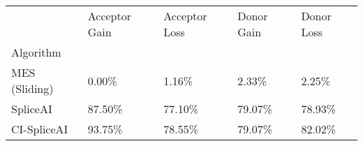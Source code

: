 \begin{tabular}{lllll}
\toprule
{} & Acceptor Gain & Acceptor Loss & Donor Gain & Donor Loss \\
Algorithm     &               &               &            &            \\
\midrule
MES (Sliding) &         0.00\% &         1.16\% &      2.33\% &      2.25\% \\
SpliceAI      &        87.50\% &        77.10\% &     79.07\% &     78.93\% \\
CI-SpliceAI   &        93.75\% &        78.55\% &     79.07\% &     82.02\% \\
\bottomrule
\end{tabular}
